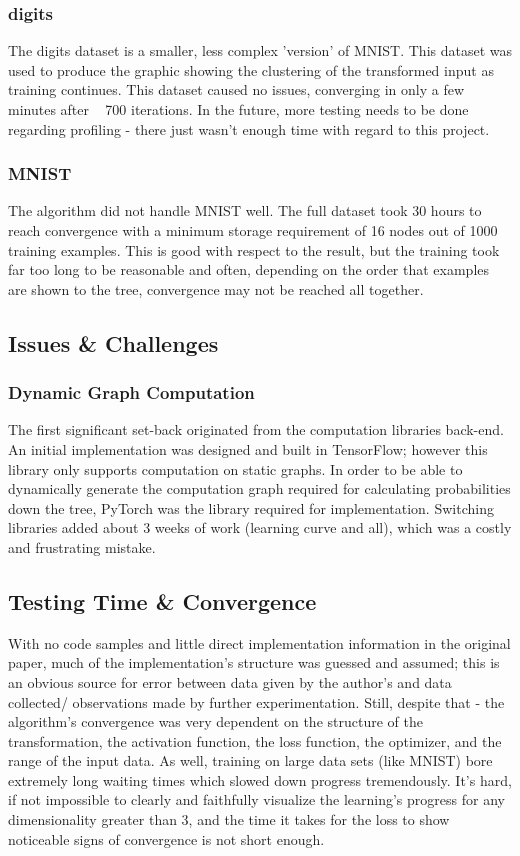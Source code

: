 \documentclass[10pt,letterpaper,twocolumn]{article}
\begin{document}
			\subsubsection{digits}
			The digits dataset is a smaller, less complex 'version' of MNIST. This dataset was used to produce the graphic showing the clustering of the transformed input as training continues. This dataset caused no issues, converging in only a few minutes after ~ 700 iterations. In the future, more testing needs to be done regarding profiling - there just wasn't enough time with regard to this project. 
			
			\subsubsection{MNIST}
			The algorithm did not handle MNIST well. The full dataset took 30 hours to reach convergence with a minimum storage requirement of 16 nodes out of 1000 training examples. This is good with respect to the result, but the training took far too long to be reasonable and often, depending on the order that examples are shown to the tree, convergence may not be reached all together. 
		\subsection{Issues \& Challenges}
			\subsubsection{Dynamic Graph Computation}
				The first significant set-back originated from the computation libraries back-end. An initial implementation was designed and built in TensorFlow; however this library only supports computation on static graphs. In order to be able to dynamically generate the computation graph required for calculating probabilities down the tree, PyTorch was the library required for implementation. Switching libraries added about 3 weeks of work (learning curve and all), which was a costly and frustrating mistake. 
			\subsection{Testing Time \& Convergence}
				With no code samples and little direct implementation information in the original paper, much of the implementation's structure was guessed and assumed; this is an obvious source for error between data given by the author's and data collected/ observations made by further experimentation. Still, despite that - the algorithm's convergence was very dependent on the structure of the transformation, the activation function, the loss function, the optimizer, and the range of the input data. As well, training on large data sets (like MNIST) bore extremely long waiting times which slowed down progress tremendously. It's hard, if not impossible to clearly and faithfully visualize the learning's progress for any dimensionality greater than 3, and the time it takes for the loss to show noticeable signs of convergence is not short enough.
	
\end{document}
